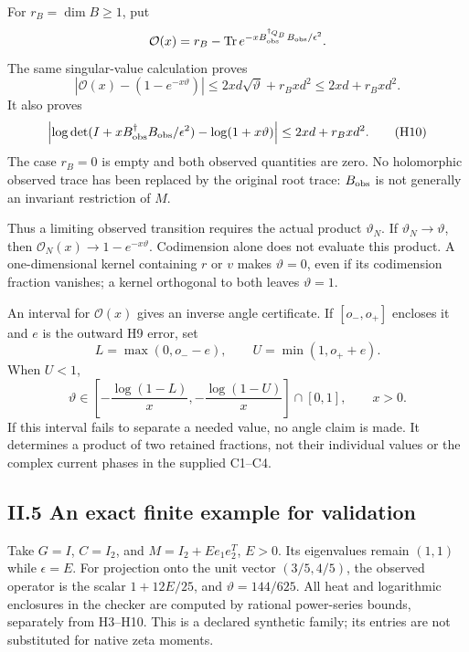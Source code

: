 For \(r_B=\dim B\ge1\), put \[
 \mathcal O(x)=r_B-\operatorname{Tr}
 e^{-x B_{\rm obs}^{\dagger_{Q_B}}B_{\rm obs}/\epsilon^2}.
\] The same singular-value calculation proves \[
 \boxed{|\mathcal O(x)-(1-e^{-x\vartheta})|
 \le2xd\sqrt\vartheta+r_Bx d^2
 \le2xd+r_Bxd^2.}
 \tag{H9}
\] It also proves \[
 \left|\log\det(I+xB_{\rm obs}^\dagger B_{\rm obs}/\epsilon^2)
 -\log(1+x\vartheta)\right|\le2xd+r_Bxd^2.
 \tag{H10}
\] The case \(r_B=0\) is empty and both observed quantities are zero. No holomorphic observed trace has been replaced by the original root trace: \(B_{\rm obs}\) is not generally an invariant restriction of \(M\).

Thus a limiting observed transition requires the actual product \(\vartheta_N\). If \(\vartheta_N\to\vartheta\), then \(\mathcal O_N(x)\to1-e^{-x\vartheta}\). Codimension alone does not evaluate this product. A one-dimensional kernel containing \(r\) or \(v\) makes \(\vartheta=0\), even if its codimension fraction vanishes; a kernel orthogonal to both leaves \(\vartheta=1\).

An interval for \(\mathcal O(x)\) gives an inverse angle certificate. If \([o_-,o_+]\) encloses it and \(e\) is the outward H9 error, set \[
 L=\max(0,o_--e),\qquad U=\min(1,o_++e).
\] When \(U<1\), \[
 \boxed{\vartheta\in
 \left[-\frac{\log(1-L)}x,-\frac{\log(1-U)}x\right]\cap[0,1],\qquad x>0.}
 \tag{H11}
\] If this interval fails to separate a needed value, no angle claim is made. It determines a product of two retained fractions, not their individual values or the complex current phases in the supplied C1--C4.

\subsection{II.5 An exact finite example for validation}\label{ii.5-an-exact-finite-example-for-validation}

Take \(G=I\), \(C=I_2\), and \(M=I_2+E e_1e_2^T\), \(E>0\). Its eigenvalues remain \((1,1)\) while \(\epsilon=E\). For projection onto the unit vector \((3/5,4/5)\), the observed operator is the scalar \(1+12E/25\), and \(\vartheta=144/625\). All heat and logarithmic enclosures in the checker are computed by rational power-series bounds, separately from H3--H10. This is a declared synthetic family; its entries are not substituted for native zeta moments.
